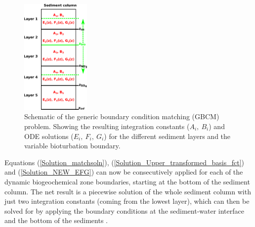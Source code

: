 \documentclass[gmd, manuscript]{copernicus}
\begin{document}
\begin{figure}[htbp]
\begin{center}
	\includegraphics[width=0.3\textwidth]{figures/Boundary_Matching_zbio.pdf}
	\caption{Schematic of the generic boundary condition matching (GBCM) problem. Showing the resulting integration constants ($A_i,\ B_i$) and ODE solutions ($E_i,\ F_i,\ G_i$) for the different sediment layers and the variable 
	bioturbation boundary.}
	\label{fig:Boundary_matching_algo}
	\end{center}
\end{figure}

Equations (\ref{Solution_matchsoln}), (\ref{Solution_Upper_transformed_basis_fct}) and (\ref{Solution_NEW_EFG}) can now be consecutively applied for each of the dynamic biogeochemical zone boundaries, starting at the bottom of the 
sediment column. The net result is a piecewise solution of the whole sediment column with just two integration constants (coming from the lowest layer), which can then be solved for by applying the boundary conditions at the 
sediment-water interface and the bottom of the sediments . 
\end{document}
